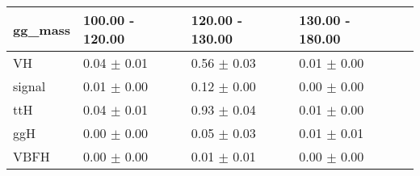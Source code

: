 \begin{longtable}[]{@{}lllll@{}}
\toprule
gg\_mass & 100.00 - 120.00 & 120.00 - 130.00 & 130.00 - 180.00
&\tabularnewline
\midrule
\endhead
VH & 0.04 \(\pm\) 0.01 & 0.56 \(\pm\) 0.03 & 0.01 \(\pm\) 0.00
&\tabularnewline
signal & 0.01 \(\pm\) 0.00 & 0.12 \(\pm\) 0.00 & 0.00 \(\pm\) 0.00
&\tabularnewline
ttH & 0.04 \(\pm\) 0.01 & 0.93 \(\pm\) 0.04 & 0.01 \(\pm\) 0.00
&\tabularnewline
ggH & 0.00 \(\pm\) 0.00 & 0.05 \(\pm\) 0.03 & 0.01 \(\pm\) 0.01
&\tabularnewline
VBFH & 0.00 \(\pm\) 0.00 & 0.01 \(\pm\) 0.01 & 0.00 \(\pm\) 0.00
&\tabularnewline
\bottomrule
\end{longtable}
